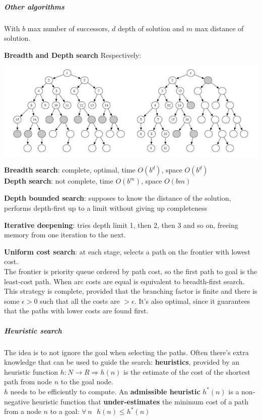 \documentclass[10pt]{report}
\begin{document}
\subparagraph{Other algorithms} With $b$ max number of successors, $d$ depth of solution and $m$ max distance of solution. \begin{list}{}{}
	\item \textbf{Breadth and Depth search} Respectively:
		\begin{center}
			\includegraphics[scale=0.75]{4.png}
		\end{center}
		\textbf{Breadth search}: complete, optimal, time $O(b^d)$, space $O(b^d)$\\
		\textbf{Depth search}: not complete, time $O(b^m)$, space $O(bm)$
	\item \textbf{Depth bounded search}: supposes to know the distance of the solution, performs depth-first up to a limit without giving up completeness
	\item \textbf{Iterative deepening}: tries depth limit 1, then 2, then 3 and so on, freeing memory from one iteration to the next.
	\item \textbf{Uniform cost search}: at each stage, selects a path on the frontier with lowest cost.\\
	The frontier is priority queue ordered by path cost, so the first path to goal is the least-cost path. When arc costs are equal is equivalent to breadth-first search.\\
	This strategy is complete, provided that the branching factor is finite and there is some $\epsilon > 0$ such that all the costs are $> \epsilon$. It's also optimal, since it guarantees that the paths with lower costs are found first.
\end{list}
\subparagraph{Heuristic search} The idea is to not ignore the goal when selecting the paths. Often there's extra knowledge that can be used to guide the search: \textbf{heuristics}, provided by an heuristic function $h:N\rightarrow R \Rightarrow h(n)$ is the estimate of the cost of the shortest path from node $n$ to the goal node.\\
$h$ needs to be efficiently to compute. An \textbf{admissible heuristic} $h^*(n)$ is a non-negative heuristic function that \textbf{under-estimates} the minimum cost of a path from a node $n$ to a goal: $\forall\:n\:\:\:h(n) \leq h^*(n)$\\\\
\end{document}
